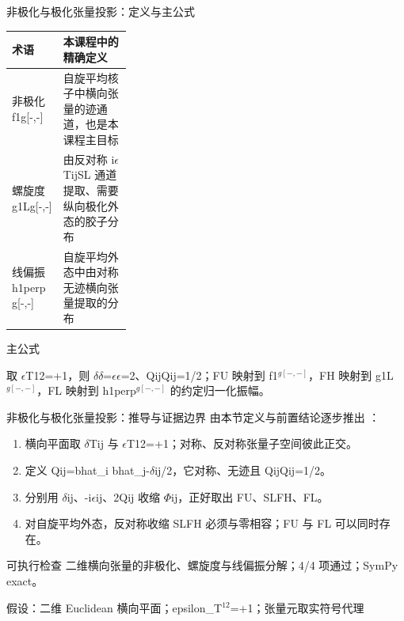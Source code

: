 \begin{frame}[t]{非极化与极化张量投影：定义与主公式}
\footnotesize\begin{tabularx}{\linewidth}{p{0.30\linewidth}Y}
\toprule 术语 & 本课程中的精确定义\\\midrule
{} 非极化 f1g[-,-] & 自旋平均核子中横向张量的迹通道，也是本课程主目标\\
 螺旋度 g1Lg[-,-] & 由反对称 i\ensuremath{\epsilon}TijSL 通道提取、需要纵向极化外态的胶子分布\\
 线偏振 h1perp g[-,-] & 自旋平均外态中由对称无迹横向张量提取的分布\\
\bottomrule\end{tabularx}\vspace{0.15cm}
\begin{block}{ 主公式}\centering{}\end{block}
取 \ensuremath{\epsilon}T12=+1，则 \ensuremath{\delta}\ensuremath{\delta}=\ensuremath{\epsilon}\ensuremath{\epsilon}=2、QijQij=1/\allowbreak{}2；FU 映射到 f1\ensuremath{^{g[-,-]}}，FH 映射到 g1L\ensuremath{^{g[-,-]}}，FL 映射到 h1perp\ensuremath{^{g[-,-]}} 的约定归一化振幅。
\end{frame}

\begin{frame}[t]{非极化与极化张量投影：推导与证据边界}
\footnotesize
{}\quad 由本节定义与前置结论逐步推出 ：
\begin{enumerate}
\item 横向平面取 \ensuremath{\delta}Tij 与 \ensuremath{\epsilon}T12=+1；对称、反对称张量子空间彼此正交。
\item 定义 Qij=bhat\_i bhat\_j-\ensuremath{\delta}ij/\allowbreak{}2，它对称、无迹且 QijQij=1/\allowbreak{}2。
\item 分别用 \ensuremath{\delta}ij、-i\ensuremath{\epsilon}ij、2Qij 收缩 \ensuremath{\Phi}ij，正好取出 FU、SLFH、FL。
\item 对自旋平均外态，反对称收缩 SLFH 必须与零相容；FU 与 FL 可以同时存在。
\end{enumerate}\begin{block}{可执行检查}
\quad 二维横向张量的非极化、螺旋度与线偏振分解；4/4 项通过；SymPy exact。
\par\scriptsize 假设：二维 Euclidean 横向平面；epsilon\_T\ensuremath{^{12}}=+1；张量元取实符号代理
\end{block}
\end{frame}

